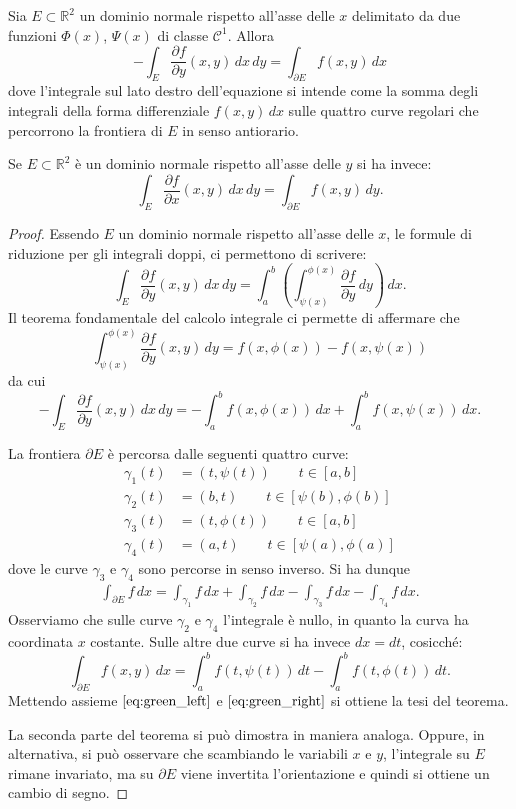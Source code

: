 \documentclass[italian,a4paper]{scrartcl}
\newcommand{\RR}{{\mathbb R}}
\begin{document}
\begin{theorem}
Sia $E\subset \RR^2$ un dominio normale rispetto all'asse delle $x$
delimitato da due funzioni $\Phi(x)$, $\Psi(x)$ di classe $\mathcal C^1$. Allora
\[
  -\int_E \frac{\partial f}{\partial y}(x,y)\, dx\, dy = \int_{\partial E} f(x,y)\, dx
\]
dove l'integrale sul lato destro dell'equazione si intende come la somma degli
integrali della forma differenziale $f(x,y)\, dx$ sulle quattro curve regolari che percorrono la frontiera di
$E$ in senso antiorario.

Se $E\subset \RR^2$ è un dominio normale rispetto all'asse delle $y$
si ha invece:
\[
  \int_E \frac{\partial f }{\partial x}(x,y)\, dx\, dy =
  \int_{\partial E} f(x,y)\, dy.
\]
\end{theorem}
\begin{proof}
Essendo $E$ un dominio normale rispetto all'asse delle $x$, le formule
di riduzione per gli integrali doppi, ci permettono di scrivere:
\[
\int_E \frac{\partial f}{\partial y}(x,y)\, dx\, dy
= \int_a^b \left(\int_{\psi(x)}^{\phi(x)} \frac{\partial f}{\partial
  y}\, dy \right)\, dx.
\]
Il teorema fondamentale del calcolo integrale ci permette di affermare
che
\[
 \int_{\psi(x)}^{\phi(x)} \frac{\partial f}{\partial
  y}(x,y) \, dy = f(x,\phi(x)) - f(x,\psi(x))
\]
da cui
\begin{equation}\label{eq:green_left}
- \int_E \frac{\partial f}{\partial y}(x,y)\, dx\, dy
=
-\int_a^b f(x,\phi(x))\, dx + \int_a^b f(x,\psi(x))\, dx.
\end{equation}

La frontiera $\partial
E$ è percorsa dalle seguenti quattro curve:
\begin{align*}
\gamma_1(t) &= (t,\psi(t)) \qquad t\in[a,b]\\
\gamma_2(t) &= (b,t) \qquad t\in[\psi(b),\phi(b)]\\
\gamma_3(t) &= (t,\phi(t)) \qquad t\in[a,b]\\
\gamma_4(t) &= (a,t) \qquad t\in[\psi(a),\phi(a)]
\end{align*}
dove le curve $\gamma_3$ e $\gamma_4$ sono percorse in senso inverso.
Si ha dunque
\begin{align*}
\int_{\partial E} f\, dx
= \int_{\gamma_1} f\, dx
 + \int_{\gamma_2} f\, dx
 - \int_{\gamma_3} f\, dx
 - \int_{\gamma_4} f\, dx.
\end{align*}
Osserviamo che sulle curve $\gamma_2$ e $\gamma_4$ l'integrale è
nullo, in quanto la curva ha coordinata $x$ costante. Sulle altre due
curve si ha invece $dx = dt$, cosicché:
\begin{equation}\label{eq:green_right}
\int_{\partial E} f(x,y)\, dx
= \int_a^b f(t,\psi(t))\, dt - \int_a^b f(t,\phi(t))\, dt.
\end{equation}
Mettendo assieme $\eqref{eq:green_left}$ e $\eqref{eq:green_right}$ si
ottiene la tesi del teorema.

La seconda parte del teorema si può dimostra in maniera analoga. Oppure, in
alternativa, si può osservare che scambiando le variabili $x$ e $y$,
l'integrale su $E$ rimane invariato, ma su $\partial E$ viene
invertita l'orientazione e quindi si ottiene un cambio di segno.
\end{proof}
\end{document}
